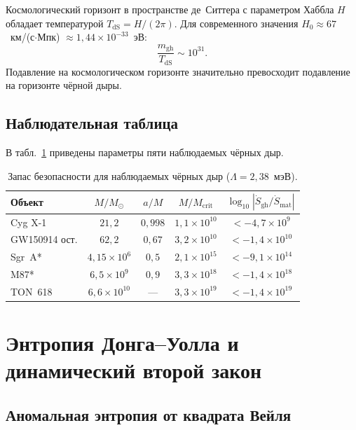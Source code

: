 \documentclass[12pt,a4paper]{article}
\newcommand{\Lam}{\Lambda}
\newcommand{\Msun}{M_{\odot}}
\newcommand{\Mcrit}{M_{\mathrm{crit}}}
\newcommand{\mghost}{m_{\mathrm{gh}}}
\theoremstyle{plain}
\theoremstyle{definition}
\begin{document}
Космологический горизонт в пространстве де~Ситтера с параметром
Хаббла $H$ обладает температурой $T_{\mathrm{dS}} = H/(2\pi)$.
Для современного значения $H_0 \approx 67$~км/(с$\cdot$Мпк)
$\approx 1{,}44 \times 10^{-33}$~эВ:
\begin{equation}
  \frac{\mghost}{T_{\mathrm{dS}}} \sim 10^{31}.
\end{equation}
Подавление на космологическом горизонте значительно превосходит
подавление на горизонте чёрной дыры.

\subsection{Наблюдательная таблица}

В табл.~\ref{tab:observed} приведены параметры пяти наблюдаемых
чёрных дыр.

\begin{table}[ht]
\centering
\caption{Запас безопасности для наблюдаемых чёрных дыр
($\Lam = 2{,}38$~мэВ).}\label{tab:observed}
\begin{tabular}{lcccc}
\toprule
Объект & $M/\Msun$ & $a/M$ & $M/\Mcrit$ & $\log_{10}|\dot{S}_{\mathrm{gh}}/\dot{S}_{\mathrm{mat}}|$ \\
\midrule
Cyg X-1         & $21{,}2$       & $0{,}998$ & $1{,}1\times 10^{10}$ & $< -4{,}7\times 10^{9}$ \\
GW150914 ост.   & $62{,}2$       & $0{,}67$  & $3{,}2\times 10^{10}$ & $< -1{,}4\times 10^{10}$ \\
Sgr~A*          & $4{,}15\times 10^6$ & $0{,}5$ & $2{,}1\times 10^{15}$ & $< -9{,}1\times 10^{14}$ \\
M87*            & $6{,}5\times 10^9$  & $0{,}9$ & $3{,}3\times 10^{18}$ & $< -1{,}4\times 10^{18}$ \\
TON~618         & $6{,}6\times 10^{10}$ & --- & $3{,}3\times 10^{19}$ & $< -1{,}4\times 10^{19}$ \\
\bottomrule
\end{tabular}
\end{table}

\section{Энтропия Донга--Уолла и динамический второй закон}%
\label{sec:dong_wall}

\subsection{Аномальная энтропия от квадрата Вейля}
\end{document}
